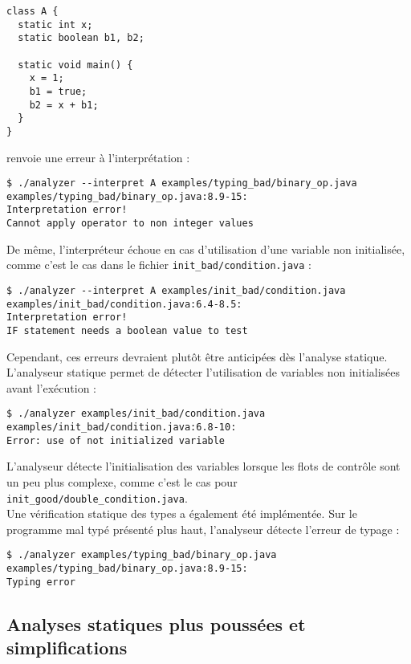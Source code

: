 \documentclass[paper=a4, fontsize=11pt]{scrartcl}
\numberwithin{figure}{section}			%
\numberwithin{table}{section}				%
\begin{document}
\begin{verbatim}
class A {
  static int x;
  static boolean b1, b2;

  static void main() {
    x = 1;
    b1 = true;
    b2 = x + b1;
  }
}
\end{verbatim}

renvoie une erreur à l'interprétation :

\begin{verbatim}
$ ./analyzer --interpret A examples/typing_bad/binary_op.java
examples/typing_bad/binary_op.java:8.9-15:
Interpretation error!
Cannot apply operator to non integer values
\end{verbatim}

De même, l'interpréteur échoue en cas d'utilisation d'une variable non initialisée, comme c'est le cas dans le fichier \texttt{init\_bad/condition.java} :

\begin{verbatim}
$ ./analyzer --interpret A examples/init_bad/condition.java
examples/init_bad/condition.java:6.4-8.5:
Interpretation error!
IF statement needs a boolean value to test
\end{verbatim}

Cependant, ces erreurs devraient plutôt être anticipées dès l'analyse statique. L'analyseur statique permet de détecter l'utilisation de variables non initialisées avant l'exécution :

\begin{verbatim}
$ ./analyzer examples/init_bad/condition.java
examples/init_bad/condition.java:6.8-10:
Error: use of not initialized variable
\end{verbatim}

L'analyseur détecte l'initialisation des variables lorsque les flots de contrôle sont un peu plus complexe, comme c'est le cas pour \texttt{init\_good/double\_condition.java}.\\

Une vérification statique des types a également été implémentée. Sur le programme mal typé présenté plus haut, l'analyseur détecte l'erreur de typage :

\begin{verbatim}
$ ./analyzer examples/typing_bad/binary_op.java
examples/typing_bad/binary_op.java:8.9-15:
Typing error
\end{verbatim}

\subsection{Analyses statiques plus poussées et simplifications}
\end{document}
